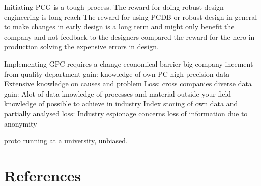\documentclass[aip,amsmath, reprint, author-year]{revtex4-1}
\begin{document}
Initiating PCG is a tough process. 
The reward for doing robust design engineering is long reach
The reward for using PCDB or robust design in general to make changes in early design is a long term and might only benefit the company and not feedback to the designers compared the reward for the hero in production solving the expensive errors in design.

Implementing GPC requires a change
	economical barrier
		big company
			incement from quality department
			gain: 	knowledge of own PC
					high precision data
					Extensive knowledge on causes and problem
			Loss:
		cross companies
			diverse data
			gain:		Alot of data
					knowledge of processes and material outside your field
					knowledge of possible to achieve in industry
					Index storing of own data and partially analysed
			loss:		Industry espionage concerns
					loss of information due to anonymity

proto running at a university, unbiased.


\section*{References}

\end{document}
